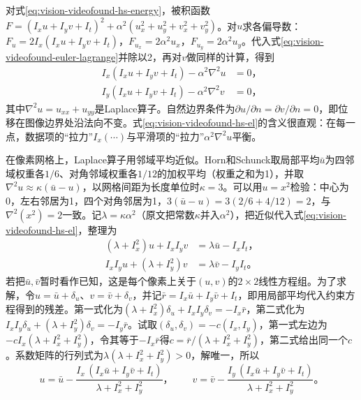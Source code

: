 对式\eqref{eq:vision-videofound-hs-energy}，被积函数$F=(I_xu+I_yv+I_t)^2+\alpha^2(u_x^2+u_y^2+v_x^2+v_y^2)$。对$u$求各偏导数：$F_u=2I_x(I_xu+I_yv+I_t)$，$F_{u_x}=2\alpha^2u_x$，$F_{u_y}=2\alpha^2u_y$。代入式\eqref{eq:vision-videofound-euler-lagrange}并除以2，再对$v$做同样的计算，得到
\begin{equation}
  \begin{aligned}
    I_x(I_xu+I_yv+I_t)-\alpha^2\nabla^2u&=0\text{，}\\
    I_y(I_xu+I_yv+I_t)-\alpha^2\nabla^2v&=0\text{，}
  \end{aligned}
  \label{eq:vision-videofound-hs-el}
\end{equation}
其中$\nabla^2u=u_{xx}+u_{yy}$是Laplace算子。自然边界条件为$\partial u/\partial n=\partial v/\partial n=0$，即位移在图像边界处沿法向不变。式\eqref{eq:vision-videofound-hs-el}的含义很直观：在每一点，数据项的“拉力”$I_x(\cdots)$与平滑项的“拉力”$\alpha^2\nabla^2u$平衡。

在像素网格上，Laplace算子用邻域平均近似。Horn和Schunck取局部平均$\bar u$为四邻域权重各$1/6$、对角邻域权重各$1/12$的加权平均（权重之和为1），并取$\nabla^2u\approx\kappa(\bar u-u)$，以网格间距为长度单位时$\kappa=3$。可以用$u=x^2$检验：中心为0，左右邻居为1，四个对角邻居为1，$3(\bar u-u)=3(2/6+4/12)=2$，与$\nabla^2(x^2)=2$一致。记$\lambda=\kappa\alpha^2$（原文把常数$\kappa$并入$\alpha^2$），把近似代入式\eqref{eq:vision-videofound-hs-el}，整理为
\[
  \begin{aligned}
    (\lambda+I_x^2)u+I_xI_yv&=\lambda\bar u-I_xI_t\text{，}\\
    I_xI_yu+(\lambda+I_y^2)v&=\lambda\bar v-I_yI_t\text{。}
  \end{aligned}
\]
若把$\bar u,\bar v$暂时看作已知，这是每个像素上关于$(u,v)$的$2\times2$线性方程组。为了求解，令$u=\bar u+\delta_u$、$v=\bar v+\delta_v$，并记$\bar r=I_x\bar u+I_y\bar v+I_t$，即用局部平均代入约束方程得到的残差。第一式化为$(\lambda+I_x^2)\delta_u+I_xI_y\delta_v=-I_x\bar r$，第二式化为$I_xI_y\delta_u+(\lambda+I_y^2)\delta_v=-I_y\bar r$。试取$(\delta_u,\delta_v)=-c(I_x,I_y)$，第一式左边为$-cI_x(\lambda+I_x^2+I_y^2)$，令其等于$-I_x\bar r$得$c=\bar r/(\lambda+I_x^2+I_y^2)$，第二式给出同一个$c$。系数矩阵的行列式为$\lambda(\lambda+I_x^2+I_y^2)>0$，解唯一，所以
\begin{equation}
  u=\bar u-\frac{I_x\,(I_x\bar u+I_y\bar v+I_t)}{\lambda+I_x^2+I_y^2}\text{，}\qquad
  v=\bar v-\frac{I_y\,(I_x\bar u+I_y\bar v+I_t)}{\lambda+I_x^2+I_y^2}\text{。}
  \label{eq:vision-videofound-hs-update}
\end{equation}


